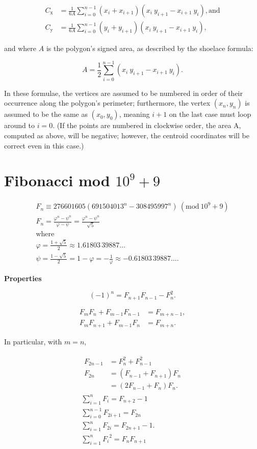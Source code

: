 \documentclass[a4paper]{article}
\newcommand{\Mod}[1]{\ (\mathrm{mod}\ #1)}
\begin{document}
\begin{landscape}
\begin{multicols}{2}
\begin{align*}
    C_{\mathrm {x} }&={\frac {1}{6A}}\sum _{i=0}^{n-1}(x_{i}+x_{i+1})(x_{i}\ y_{i+1}-x_{i+1}\ y_{i}), \text{and}\\
C_{\mathrm {y} }&={\frac {1}{6A}}\sum _{i=0}^{n-1}(y_{i}+y_{i+1})(x_{i}\ y_{i+1}-x_{i+1}\ y_{i}),
\end{align*}


and where $A$ is the polygon's signed area, as described by the shoelace formula:

$$A={\frac {1}{2}}\sum _{i=0}^{n-1}(x_{i}\ y_{i+1}-x_{i+1}\ y_{i}).$$

In these formulae, the vertices are assumed to be numbered in order of their occurrence along the polygon's perimeter; furthermore, the vertex $( x_n, y_n )$ is assumed to be the same as $( x_0, y_0 )$, meaning $i+1$ on the last case must loop around to $i=0$. (If the points are numbered in clockwise order, the area A, computed as above, will be negative; however, the centroid coordinates will be correct even in this case.)

\section{Fibonacci mod $10^9+9$}

\begin{gather*}
F_n \equiv 276601605(691504013^n - 308495997^n) \Mod{10^9 + 9} \\
F_{n}={\frac {\varphi ^{n}-\psi ^{n}}{\varphi -\psi }}={\frac {\varphi ^{n}-\psi ^{n}}{\sqrt {5}}}\\
\text{where}\\
\varphi ={\frac {1+{\sqrt {5}}}{2}}\approx 1.61803\,39887\ldots\\
\psi ={\frac {1-{\sqrt {5}}}{2}}=1-\varphi =-{ \frac{1}{\varphi}  }\approx -0.61803\,39887\ldots .
\end{gather*}


\textbf{Properties}

$$(-1)^{n}=F_{n+1}F_{n-1}-F_{n}^{2}.$$

$$\begin{aligned}
{F_{m}}{F_{n}}+{F_{m-1}}{F_{n-1}}&=F_{m+n-1},\\
F_{m}F_{n+1}+F_{m-1}F_{n}&=F_{m+n}.
\end{aligned}$$

In particular, with $m = n$,

\begin{align*}
    \begin{aligned}F_{2n-1}&=F_{n}^{2}+F_{n-1}^{2}\\F_{2n}&=(F_{n-1}+F_{n+1})F_{n}\\&=(2F_{n-1}+F_{n})F_{n}.\end{aligned}\\
\sum _{i=1}^{n}F_{i}=F_{n+2}-1\\
\sum _{i=0}^{n-1}F_{2i+1}=F_{2n}\\
\sum _{i=1}^{n}F_{2i}=F_{2n+1}-1.\\
\sum _{i=1}^{n}{F_{i}}^{2}=F_{n}F_{n+1}\\
\end{align*}


\end{multicols}
\end{landscape}
\end{document}
